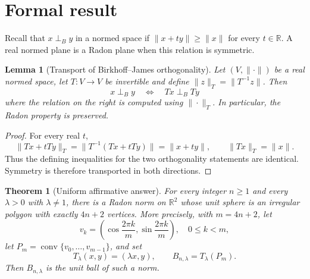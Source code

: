 \documentclass[11pt]{article}
\newtheorem{theorem}{Theorem}
\newtheorem{lemma}{Lemma}
\newcommand{\R}{\mathbb{R}}
\newcommand{\perpB}{\mathrel{\perp_B}}
\begin{document}
\section{Formal result}

Recall that $x\perpB y$ in a normed space if
$\|x+ty\|\geq\|x\|$ for every $t\in\R$.  A real normed plane is a Radon plane
when this relation is symmetric.

\begin{lemma}[Transport of Birkhoff--James orthogonality]
Let $(V,\|\cdot\|)$ be a real normed space, let $T:V\to V$ be invertible and
define $\|z\|_T=\|T^{-1}z\|$.  Then
\[
 x\perpB y \quad\Longleftrightarrow\quad Tx\perpB Ty
\]
where the relation on the right is computed using $\|\cdot\|_T$.  In
particular, the Radon property is preserved.
\end{lemma}

\begin{proof}
For every real $t$,
\[
 \|Tx+tTy\|_T=\|T^{-1}(Tx+tTy)\|=\|x+ty\|,
 \qquad \|Tx\|_T=\|x\|.
\]
Thus the defining inequalities for the two orthogonality statements are
identical.  Symmetry is therefore transported in both directions.
\end{proof}

\begin{theorem}[Uniform affirmative answer]
For every integer $n\geq1$ and every $\lambda>0$ with $\lambda\ne1$, there is
a Radon norm on $\R^2$ whose unit sphere is an irregular polygon with exactly
$4n+2$ vertices.  More precisely, with $m=4n+2$, let
\[
 v_k=\left(\cos\frac{2\pi k}{m},\sin\frac{2\pi k}{m}\right),
 \quad 0\leq k<m,
 \]
let $P_m=\operatorname{conv}\{v_0,\ldots,v_{m-1}\}$, and set
\[
 T_\lambda(x,y)=(\lambda x,y), \qquad B_{n,\lambda}=T_\lambda(P_m).
\]
Then $B_{n,\lambda}$ is the unit ball of such a norm.
\end{theorem}
\end{document}
